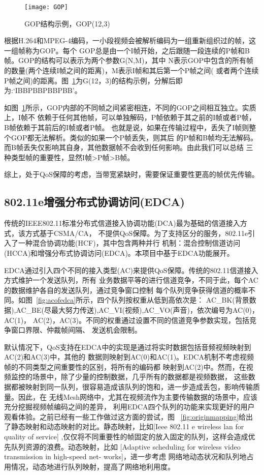 \begin{figure}[H] %
  \centering
  \texttt{[image: GOP]}
  \caption{GOP结构示例，GOP(12,3)}
  \label{fig:gop}
\end{figure}
根据H.264和MPEG-4编码，一小段视频会被解析编码为一组重新组织过的帧，这一组帧称为GOP。每个
GOP总是由一个I帧开始，之后跟随一段连续的P帧和B帧。GOP的结构可以表示为两个参数G(N,M)，其中
N表示GOP中包含的所有帧的数量(两个连续I帧之间的距离)，M表示I帧和其后第一个P帧之间(
或者两个连续P帧之间)的距离。图~\ref{fig:gop}为G(12，3)的结构示例，分解后即为:‘IBBPBBPBBPBB’。

如图~\ref{fig:gop}所示，GOP内部的不同帧之间紧密相连，不同的GOP之间相互独立。实质上，I帧不
依赖于任何其他帧，可以单独解码，P帧依赖于其之前的I帧或者P帧，B帧依赖于其前后的I帧或者P帧。
也就是说，如果在传输过程中，丢失了I帧则整个GOP都无法解析。类似的如果一个P帧丢失，则其后
的P帧和B帧均无法解码。而B帧丢失仅影响其自身，其他数据帧不会收到任何影响。由此我们可以总结
三种类型帧的重要性，显然I帧>P帧>B帧。

综上，处于QoS保障的考虑，当带宽紧缺时，需要保证重要性更高的帧优先传输。

\subsection{802.11e增强分布式协调访问(EDCA)}
传统的IEEE802.11标准分布式信道接入协调功能(DCA)最为基础的信道接入方式，该方式基于CSMA/CA，
不提供QoS保障。为了支持区分的服务，802.11e引入了一种混合协调功能(HCF)，其中包含两种并行
机制：混合控制信道访问(HCCA)和增强分布式协调访问(EDCA)。本项目中基于EDCA功能展开。

EDCA通过引入四个不同的接入类型(AC)来提供QoS保障。传统的802.11信道接入方式维护一个发送队列，所有
业务数据平等的进行信道竞争，不同于此，每个AC的数据维护各自的发送队列，通过竞争窗口控制
每个队列竞争获得信道的概率不同。如图~\ref{fig:acofedca}所示，四个队列按权重从低到高依次是：
AC\_BK(背景数据),AC\_BE(尽最大努力传送),AC\_VI(视频),AC\_VO(声音)，依次编号为AC(0)，AC(1)，
AC(2)，AC(3)。不同的权重通过设置不同的信道竞争参数实现，包括竞争窗口界限、仲裁帧间隔、
发送机会限制。

默认情况下，QoS支持在EDCA中的实现是通过将实时数据包括音频视频映射到AC(2)和AC(3)中，其他的
数据则映射到AC(0)和AC(1)。EDCA机制不考虑视频帧的不同类型之间重要性的区别，将所有的编码都
映射到AC(2)中。然而，在视频监控的场景中，除了少量的控制数据，几乎所有的数据都是视频数据，
这些数据都被映射到同一队列，很容易造成该队列的饱和，进一步造成丢包，影响传输质量。因此，在
无线Mesh网络中，尤其在视频流作为主要传输数据的场景中，应该充分挖掘视频帧编码之间的差异，
利用EDCA四个队列的功能来实现更好的用户观看体验。之前已经有一些工作做过这方面的尝试，图
~\ref{fig:originmapping}给出了静态映射和动态映射的对比。静态映射，比如[Ieee 802.11 e wireless lan for quality of service]
,仅仅将不同重要性的帧固定的放入固定的队列，这样会造成优先队列资源的浪费。动态映射，比如
[Adaptive scheduling for wireless video transmission in high-speed net- works]，进一步考虑
网络地动态状况和队列地占用情况，动态地进行队列映射，提高了网络地利用度。

